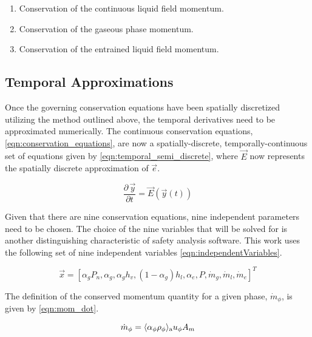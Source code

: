\begin{enumerate}
\item{Conservation of the continuous liquid field momentum.}
\item{Conservation of the gaseous phase momentum.}
\item{Conservation of the entrained liquid field momentum.}
\end{enumerate}

\subsection{Temporal Approximations}
\label{subsect:temporal_approx}

Once the governing conservation equations have been spatially discretized utilizing the method outlined above, the temporal derivatives need to be approximated numerically.
The continuous conservation equations, \eqref{eqn:conservation_equations}, are now a spatially-discrete, temporally-continuous set of equations given by \eqref{eqn:temporal_semi_discrete}, where $\vec{E}$ now represents the spatially discrete approximation of $\vec{e}$.

\begin{equation}
\label{eqn:temporal_semi_discrete}
\frac{\partial \,\vec{y} }{\partial t} = \vec{E}(\vec{y}(t))
\end{equation}

Given that there are nine conservation equations, nine independent parameters need to be chosen.
The choice of the nine variables that will be solved for is another distinguishing characteristic of safety analysis software.
This work uses the following set of nine independent variables \eqref{eqn:independentVariables}.

\begin{equation}
\label{eqn:independentVariables}
\vec{x} = [\alpha_{g}P_{n}, \alpha_g, \alpha_g h_v, (1 - \alpha_g) h_l, \alpha_e, P, \dot{m}_g, \dot{m}_l, \dot{m}_e]^{T}
\end{equation}

The definition of the conserved momentum quantity for a given phase, $\dot{m}_{\phi}$, is given by \eqref{eqn:mom_dot}.

\begin{equation}
\label{eqn:mom_dot}
\dot{m}_{\phi} = \ave{\alpha_{\phi} \rho_{\phi}}_{\text{a}} u_{\phi} A_{m}
\end{equation}

